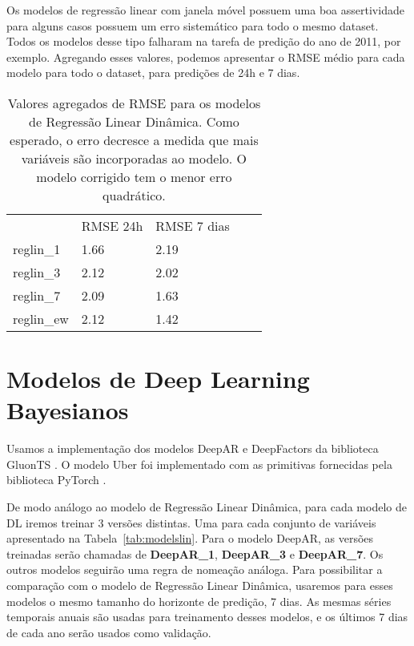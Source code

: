 Os modelos de regressão linear com janela móvel possuem uma boa assertividade
para alguns casos possuem um erro sistemático para todo o mesmo dataset. Todos
os modelos desse tipo falharam na tarefa de predição do ano de 2011, por exemplo.
Agregando esses valores, podemos apresentar o RMSE médio para cada modelo para
todo o dataset, para predições de 24h e 7 dias.

\begin{center}
  \begin{table}[]
    \centering
    \begin{tabular}{l|llll}
      \cline{2-3}
      & \multicolumn{1}{l|}{RMSE 24h} & \multicolumn{1}{l|}{RMSE 7 dias} &  \\ \cline{1-3}
      \multicolumn{1}{|l|}{reglin\_1} & 1.66                          & 2.19                             &  \\ \cline{1-1}
      \multicolumn{1}{|l|}{reglin\_3} & 2.12                          & 2.02                             &  \\ \cline{1-1}
      \multicolumn{1}{|l|}{reglin\_7} & 2.09                          & 1.63                             &  \\ \cline{1-1}
      \multicolumn{1}{|l|}{reglin\_ew} & 2.12                          & 1.42                            &  \\ \cline{1-1}
    \end{tabular}
    \caption{Valores agregados de RMSE para os modelos de Regressão Linear
      Dinâmica. Como esperado, o erro decresce a medida que mais variáveis são
      incorporadas ao modelo. O modelo corrigido tem o menor erro quadrático.}

    \label{tb:rmse_exp}
  \end{table}
\end{center}



\section{Modelos de Deep Learning Bayesianos}


Usamos a implementação dos modelos DeepAR e DeepFactors da biblioteca GluonTS
\citep{gluonts}. O modelo Uber foi implementado com as primitivas fornecidas
pela biblioteca PyTorch \citep{pytorch}.

De modo análogo ao modelo de Regressão Linear Dinâmica, para
cada modelo de DL iremos treinar 3 versões distintas. Uma para cada conjunto de
variáveis apresentado na Tabela~\ref{tab:modelslin}. Para o modelo DeepAR, as versões treinadas serão chamadas de \textbf{DeepAR\_1},
\textbf{DeepAR\_3} e \textbf{DeepAR\_7}. Os outros modelos seguirão uma
regra de nomeação análoga. Para possibilitar a comparação com o modelo de Regressão Linear Dinâmica, usaremos para esses modelos o mesmo
tamanho do horizonte de predição, 7 dias. As mesmas séries temporais anuais são
usadas para treinamento desses modelos, e os últimos 7 dias de cada ano serão
usados como validação.

